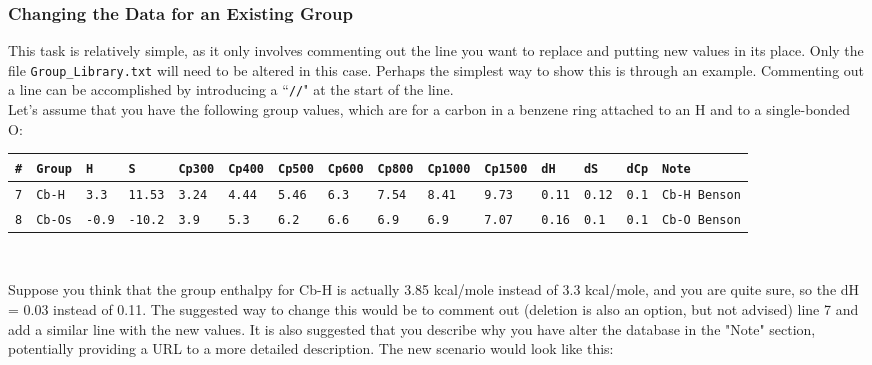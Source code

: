 \documentclass[12pt,letterpaper]{article}
\begin{document}
\subsubsection{Changing the Data for an Existing Group}\label{changing thermo data}

This task is relatively simple, as it only involves commenting out the line you
want to replace and putting new values in its place. Only the file \texttt{Group\_Library.txt}
will need to be altered in this case. Perhaps the simplest way to show this
is through an example. Commenting out a line can be accomplished by
introducing a ``\texttt{//}" at the start of the line.\\

Let's assume that you have the following group values, which are for a
carbon in a benzene ring attached to an H and to a single-bonded O:\\

{\tiny{
\begin{tabular}{lllllllllllllll}
\texttt{\#} & \texttt{Group} & \texttt{H} & \texttt{S} & \texttt{Cp300} & \texttt{Cp400} & \texttt{Cp500} & \texttt{Cp600} & \texttt{Cp800} & \texttt{Cp1000} & \texttt{Cp1500} & \texttt{dH} & \texttt{dS} & \texttt{dCp} & \texttt{Note} \\ \hline
\texttt{7} & \texttt{Cb-H} & \texttt{3.3} & \texttt{11.53} & \texttt{3.24} & \texttt{4.44} & \texttt{5.46} & \texttt{6.3} & \texttt{7.54} & \texttt{8.41} & \texttt{9.73} & \texttt{0.11} & \texttt{0.12} & \texttt{0.1} & \texttt{Cb-H Benson} \\
\texttt{8} & \texttt{Cb-Os} & \texttt{-0.9} & \texttt{-10.2} & \texttt{3.9} & \texttt{5.3} & \texttt{6.2} & \texttt{6.6} & \texttt{6.9} & \texttt{6.9} & \texttt{7.07} & \texttt{0.16} & \texttt{0.1} & \texttt{0.1} & \texttt{Cb-O Benson} \\
\end{tabular}\\
}}

Suppose you think that the group enthalpy for Cb-H is actually 3.85
kcal/mole instead of 3.3 kcal/mole, and you are quite sure, so the dH = 0.03 instead of 0.11. The suggested way
to change this would be to comment out (deletion is also an option, but
not advised) line 7 and add a similar line with the new values. It is also
suggested that you describe why you have alter the database in the "Note"
section, potentially providing a URL to a more detailed description. The
new scenario would look like this:\\
\end{document}
